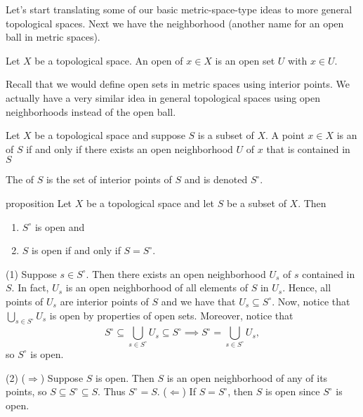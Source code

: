 \documentclass[class=article, crop=false]{standalone}
\begin{document}
Let's start translating some of our basic metric-space-type ideas to more general topological spaces. Next we have the neighborhood (another name for an open ball in metric spaces).

\begin{defn}[Neighborhood]
  Let $X$ be a topological space. An open  of $x \in X$ is an open set $U$ with $x \in U$.
\end{defn}

Recall that we would define open sets in metric spaces using interior points. We actually have a very similar idea in general topological spaces using open neighborhoods instead of the open ball.

\begin{defn}
  Let $X$ be a topological space and suppose $S$ is a subset of $X$. A point $x \in X$ is an  of $S$ if and only if there exists an open neighborhood $U$ of $x$ that is contained in $S$

  The  of $S$ is the set of interior points of $S$ and is denoted $S^\circ$.
\end{defn}

\begin{result}{proposition}{\label{prop:interior-is-open-and-open-iff-set-is-interior}}
  Let $X$ be a topological space and let $S$ be a subset of $X$. Then
  \begin{enumerate}[(1)]
    \item $S^\circ$ is open and
    \item $S$ is open if and only if $S = S^\circ$.
  \end{enumerate}
\end{result}
\begin{pf}
  (1) Suppose $s \in S^\circ$. Then there exists an open neighborhood $U_s$ of $s$ contained in $S$. In fact, $U_s$ is an open neighborhood of all elements of $S$ in $U_s$. Hence, all points of $U_s$ are interior points of $S$ and we have that $U_s \subseteq S^\circ$. Now, notice that $\bigcup_{s \in S^\circ}^{} U_s$ is open by properties of open sets. Moreover, notice that
    \[
      S^\circ \subseteq \bigcup_{s \in S^\circ}^{} U_s \subseteq S^\circ \implies S^\circ = \bigcup_{s \in S^\circ}^{} U_s,
    \]
  so $S^\circ$ is open.

  (2) ($\Rightarrow$) Suppose $S$ is open. Then $S$ is an open neighborhood of any of its points, so $S \subseteq S^\circ \subseteq S$. Thus $S^\circ = S$. ($\Leftarrow$) If $S = S^\circ$, then $S$ is open since $S^\circ$ is open.
\end{pf}
\end{document}
